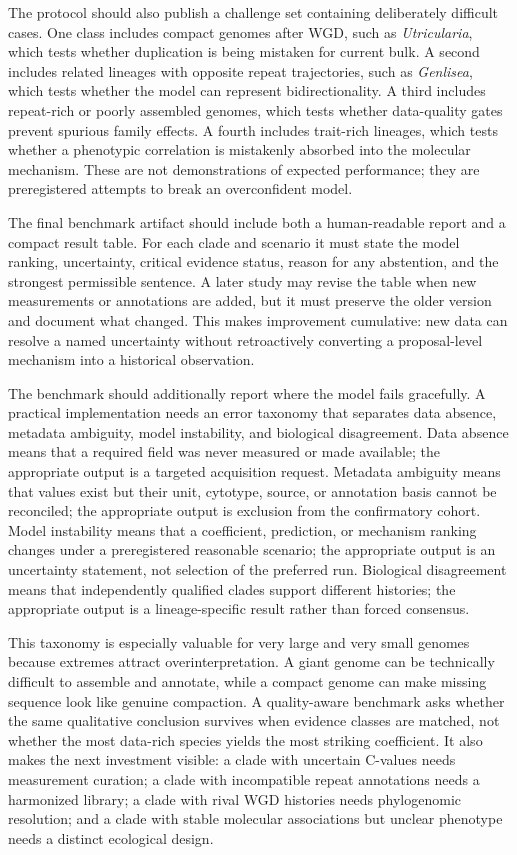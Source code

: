 \documentclass[conference]{IEEEtran}
\begin{document}
The protocol should also publish a challenge set containing deliberately difficult cases. One class includes compact genomes after WGD, such as \emph{Utricularia}, which tests whether duplication is being mistaken for current bulk. A second includes related lineages with opposite repeat trajectories, such as \emph{Genlisea}, which tests whether the model can represent bidirectionality. A third includes repeat-rich or poorly assembled genomes, which tests whether data-quality gates prevent spurious family effects. A fourth includes trait-rich lineages, which tests whether a phenotypic correlation is mistakenly absorbed into the molecular mechanism. These are not demonstrations of expected performance; they are preregistered attempts to break an overconfident model.

The final benchmark artifact should include both a human-readable report and a compact result table. For each clade and scenario it must state the model ranking, uncertainty, critical evidence status, reason for any abstention, and the strongest permissible sentence. A later study may revise the table when new measurements or annotations are added, but it must preserve the older version and document what changed. This makes improvement cumulative: new data can resolve a named uncertainty without retroactively converting a proposal-level mechanism into a historical observation.

The benchmark should additionally report where the model fails gracefully. A practical implementation needs an error taxonomy that separates data absence, metadata ambiguity, model instability, and biological disagreement. Data absence means that a required field was never measured or made available; the appropriate output is a targeted acquisition request. Metadata ambiguity means that values exist but their unit, cytotype, source, or annotation basis cannot be reconciled; the appropriate output is exclusion from the confirmatory cohort. Model instability means that a coefficient, prediction, or mechanism ranking changes under a preregistered reasonable scenario; the appropriate output is an uncertainty statement, not selection of the preferred run. Biological disagreement means that independently qualified clades support different histories; the appropriate output is a lineage-specific result rather than forced consensus.

This taxonomy is especially valuable for very large and very small genomes because extremes attract overinterpretation. A giant genome can be technically difficult to assemble and annotate, while a compact genome can make missing sequence look like genuine compaction. A quality-aware benchmark asks whether the same qualitative conclusion survives when evidence classes are matched, not whether the most data-rich species yields the most striking coefficient. It also makes the next investment visible: a clade with uncertain C-values needs measurement curation; a clade with incompatible repeat annotations needs a harmonized library; a clade with rival WGD histories needs phylogenomic resolution; and a clade with stable molecular associations but unclear phenotype needs a distinct ecological design.
\end{document}

